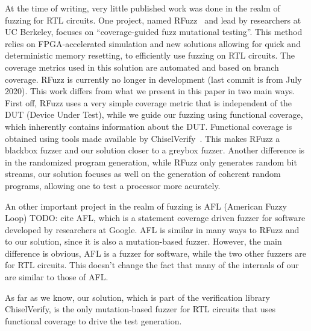 \documentclass[conference]{IEEEtran}
\newcommand{\todo}[1]{{\color{olive} TODO: #1}}
\newcommand{\rewrite}[1]{{\color{red} rewrite: #1}}
\begin{document}
At the time of writing, very little published work was done in the realm of fuzzing for RTL circuits.
One project, named RFuzz~\cite{rfuzz2018} and lead by researchers at UC Berkeley, focuses on ``coverage-guided fuzz mutational testing''. This method relies on FPGA-accelerated simulation and new solutions allowing for quick and deterministic memory resetting, to efficiently use fuzzing on RTL circuits. The coverage metrics used in this solution are automated and based on branch coverage. RFuzz is currently no longer in development (last commit is from July 2020). This work differs from what we present in this paper in two main ways. First off, RFuzz uses a very simple coverage metric that is independent of the DUT (Device Under Test), while we guide our fuzzing using functional coverage, which inherently contains information about the DUT. Functional coverage is obtained using tools made available by ChiselVerify~\cite{verify:chisel:2020, dobis2021opensource}. This makes RFuzz a blackbox fuzzer and  our solution closer to a greybox fuzzer. Another difference is in the randomized program generation, while RFuzz only generates random bit streams, our solution focuses as well on the generation of coherent random programs, allowing one to test a processor more acurately. 

An other important project in the realm of fuzzing is AFL (American Fuzzy Loop)\todo{cite AFL}, which is a statement coverage driven fuzzer for software developed by researchers at Google. AFL is similar in many ways to RFuzz and to our solution, since it is also a mutation-based fuzzer. However, the main difference is obvious, AFL is a fuzzer for software, while the two other fuzzers are for RTL circuits. This doesn't change the fact that many of the internals of our are similar to those of AFL.

As far as we know, our solution, which is part of the verification library ChiselVerify, is the only mutation-based fuzzer for RTL circuits that uses functional coverage to drive the test generation.

\end{document}
